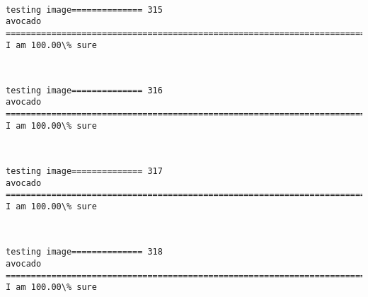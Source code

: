 \documentclass[11pt]{article}
\begin{document}
    \begin{center}
    \end{center}
    { \hspace*{\fill} \\}
    
    \begin{Verbatim}[commandchars=\\\{\}]
testing image============== 315
avocado
============================================================================
I am 100.00\% sure

    \end{Verbatim}

    \begin{center}
    \end{center}
    { \hspace*{\fill} \\}
    
    \begin{Verbatim}[commandchars=\\\{\}]
testing image============== 316
avocado
============================================================================
I am 100.00\% sure

    \end{Verbatim}

    \begin{center}
    \end{center}
    { \hspace*{\fill} \\}
    
    \begin{Verbatim}[commandchars=\\\{\}]
testing image============== 317
avocado
============================================================================
I am 100.00\% sure

    \end{Verbatim}

    \begin{center}
    \end{center}
    { \hspace*{\fill} \\}
    
    \begin{Verbatim}[commandchars=\\\{\}]
testing image============== 318
avocado
============================================================================
I am 100.00\% sure

    \end{Verbatim}
\end{document}
